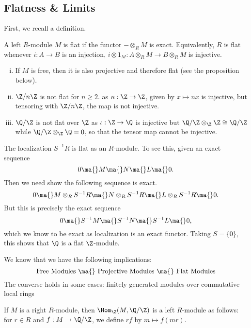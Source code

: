 \subsection{Flatness \& Limits}



First, we recall a definition. 

\begin{dfn}
A left $R$-module $M$ is flat if the functor $- \otimes_R M$ is exact. Equivalently, $R$ is flat whenever $i: A \to B$ is an injection, $i \otimes 1_M: A \otimes_R M \to B \otimes_R M$ is injective. 
\end{dfn}


\begin{ex} \hfill
	\begin{enumerate}[(i)]
	\item If $M$ is free, then it is also projective and therefore flat (see the proposition below).
	\item $\Z/n\Z$ is not flat for $n \geq 2$. as $n: \Z \to \Z$, given by $x \mapsto nx$ is injective, but tensoring with $\Z/n\Z$, the map is not injective. 
	\item $\Q/\Z$ is not flat over $\Z$ as $\iota: \Z \to \Q$ is injective but $\Q/\Z \otimes_\Z \Z \cong \Q/\Z$ while $\Q/\Z \otimes_\Z \Q=0$, so that the tensor map cannot be injective. 
	\end{enumerate} \xqed
\end{ex}


\begin{ex}
The localization $S^{-1}R$ is flat as an $R$-module. To see this, given an exact sequence
	\[
	0 \ma{} M \ma{} N \ma{} L \ma{} 0.
	\]
Then we need show the following sequence is exact.
	\[
	0 \ma{} M \otimes_R S^{-1}R \ma{} N \otimes_R S^{-1}R \ma{} L \otimes_R S^{-1}R \ma{} 0.
	\]
But this is precisely the exact sequence
	\[
	0 \ma{} S^{-1}M \ma{} S^{-1}N \ma{} S^{-1}L \ma{} 0,
	\]
which we know to be exact as localization is an exact functor. Taking $S=\{0\}$, this shows that $\Q$ is a flat $\Z$-module. \xqed
\end{ex}


\begin{prop}
We know that we have the following implications:
	\[
	\text{ Free Modules } \ma{} \text{ Projective Modules } \ma{} \text{ Flat Modules }
	\]
The converse holds in some cases: finitely generated modules over commutative local rings
\end{prop}


If $M$ is a right $R$-module, then $\Hom_\Z(M,\Q/\Z)$ is a left $R$-module as follows: for $r \in R$ and $f: M \to \Q/\Z$, we define $rf$ by $m \mapsto f(mr)$. 


